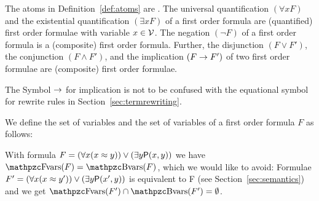 
\begin{definition}\label{def:syntax:FOF}
	The atoms in Definition~\vref{def:atoms} are .
	The universal quantification \( (\forall x F) \)
	and the existential quantification \( (\exists x F) \)
	of a first order formula are (quantified) first order formulae
	with  variable \( x\in\mathcal{V} \).
	The negation \( (\lnot F) \) of a first order formula
	is a (composite) first order formula.
	Further, the disjunction \( (F \lor F') \),
	the conjunction \( (F \land F')  \),
	and the implication \( (F \rightarrow F') \)
	of two first order formulae
	are (composite) first order formulae.
\end{definition}

\begin{remark}
	The Symbol \( \rightarrow \) for implication is not to be confused
	with the equational symbol for rewrite rules in Section~\ref{sec:termrewriting}.
\end{remark}

\begin{definition}\label{def:fof:fvars}\label{def:fof:bvars}
	We define the set of  variables and the set of  variables
	of a first order formula \( F \) as follows:
\end{definition}

\begin{example}
	With formula \( F = (\forall x (x\approx y)) \lor (\exists y \mathsf{P}(x,y)) \)
	we have \( \fvar(F) = \bvar(F) \), which we would like to avoid:
	Formulae
	\( F' = (\forall x (x\approx y')) \lor (\exists y \mathsf{P}(x',y)) \)
	is equivalent to F (see Section~\vref{sec:semantics})
	and we get
	\( \fvar(F') \cap \bvar(F') = \emptyset \).
\end{example}

